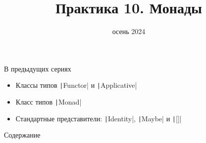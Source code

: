 
\newif\ifhandout




\title[10. Монады]{Практика 10. Монады}
\date{осень 2024}



    \setcounter{framenumber}{-1}
    \maketitle

    \begin{frame}[fragile]{В предыдущих сериях}
        \begin{itemize}
            \item Классы типов \texttt|Functor| и \texttt|Applicative|
            \item[\newtopic] Класс типов \texttt|Monad|
            \item[\newtopic] Стандартные представители: \texttt|Identity|, \texttt|Maybe| и \texttt|[]|
        \end{itemize}
    \end{frame}

    \begin{frame}[noframenumbering]{Содержание}
        \tableofcontents
    \end{frame}


